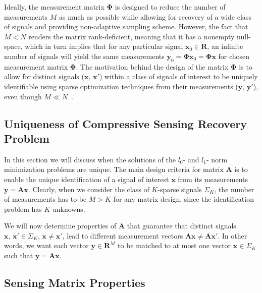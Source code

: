 \documentclass[journal]{IEEEtran}
\begin{document}
Ideally, the measurement matrix $\boldsymbol{\Phi}$ is designed to reduce the number of measurements $M$ as much as possible while allowing for recovery of a wide class of signals and providing non-adaptive sampling scheme. However, the fact that $M<N$ renders the matrix rank-deficient, meaning that it has a nonempty null-space, which in turn implies that for any particular signal $\boldsymbol{x}_0\in \mathbf{R}$, an infinite number of signals will yield the same measurements $\boldsymbol{y}_0=\boldsymbol{\Phi} \boldsymbol{x}_0 = \boldsymbol{\Phi} \boldsymbol{x}$ for chosen measurement matrix $\boldsymbol{\Phi}$. The motivation behind the design of the matrix $\boldsymbol{\Phi}$ is to allow for distinct signals ($\boldsymbol{x},\,\boldsymbol{x'}$) within a class of signals of interest to be uniquely identifiable using sparse optimization techniques from their measurements ($\boldsymbol{y},\,\boldsymbol{y'}$), even though $M\ll N$~\cite{Duarte2011}.

\subsection{Uniqueness of Compressive Sensing Recovery Problem}
In this section we will discuss when the solutions of the $l_0$- and $l_1$- norm minimization problems are unique. The main design criteria for matrix $\boldsymbol{A}$ is to enable the unique identification of a signal of interest $\boldsymbol{x}$ from its measurements $\boldsymbol{y}=\boldsymbol{A}\boldsymbol{x}$. Clearly, when we consider the class of $K$-sparse signals $\Sigma_K$, the number of measurements has to be $M>K$ for any matrix design, since the identification problem has $K$ unknowns.

We will now determine properties of $\boldsymbol{A}$ that guarantee that distinct signals $\boldsymbol{x},\,\boldsymbol{x'}\in \Sigma_K,\, \boldsymbol{x}\neq \boldsymbol{x'}$, lead to different measurement vectors $\boldsymbol{A}\boldsymbol{x}\neq \boldsymbol{A}\boldsymbol{x'}$. In other words, we want each vector $\boldsymbol{y}\in \mathbf{R}^M$ to be matched to at most one vector $\boldsymbol{x}\in \Sigma_K$ such that $\boldsymbol{y}=\boldsymbol{A}\boldsymbol{x}$.

\subsection{Sensing Matrix Properties}
\end{document}
